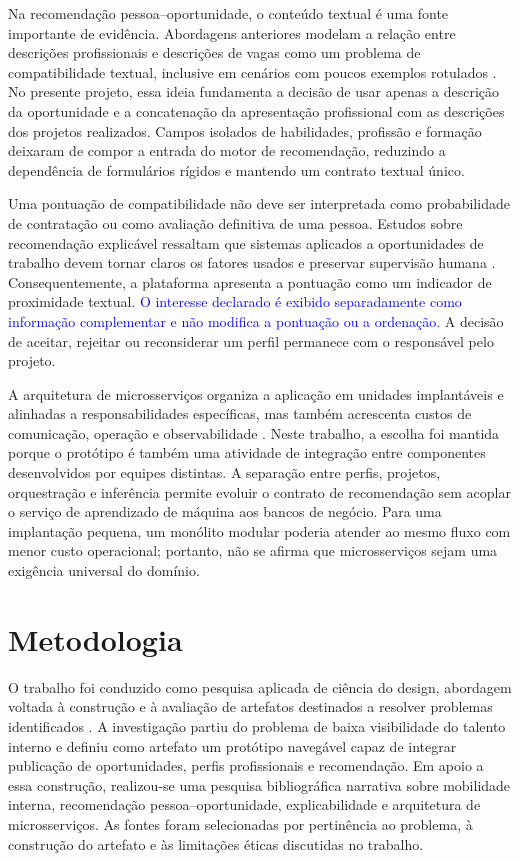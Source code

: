 \documentclass[12pt]{article}
\begin{document}
Na recomendação pessoa--oportunidade, o conteúdo textual é uma fonte importante de evidência. Abordagens anteriores modelam a relação entre descrições profissionais e descrições de vagas como um problema de compatibilidade textual, inclusive em cenários com poucos exemplos rotulados \cite{bian2019domain}. No presente projeto, essa ideia fundamenta a decisão de usar apenas a descrição da oportunidade e a concatenação da apresentação profissional com as descrições dos projetos realizados. Campos isolados de habilidades, profissão e formação deixaram de compor a entrada do motor de recomendação, reduzindo a dependência de formulários rígidos e mantendo um contrato textual único.

Uma pontuação de compatibilidade não deve ser interpretada como probabilidade de contratação ou como avaliação definitiva de uma pessoa. Estudos sobre recomendação explicável ressaltam que sistemas aplicados a oportunidades de trabalho devem tornar claros os fatores usados e preservar supervisão humana \cite{tang2025explainable}. Consequentemente, a plataforma apresenta a pontuação como um indicador de proximidade textual. \textcolor{blue}{O interesse declarado é exibido separadamente como informação complementar e não modifica a pontuação ou a ordenação.} A decisão de aceitar, rejeitar ou reconsiderar um perfil permanece com o responsável pelo projeto.

A arquitetura de microsserviços organiza a aplicação em unidades implantáveis e alinhadas a responsabilidades específicas, mas também acrescenta custos de comunicação, operação e observabilidade \cite{pahl2016microservices}. Neste trabalho, a escolha foi mantida porque o protótipo é também uma atividade de integração entre componentes desenvolvidos por equipes distintas. A separação entre perfis, projetos, orquestração e inferência permite evoluir o contrato de recomendação sem acoplar o serviço de aprendizado de máquina aos bancos de negócio. Para uma implantação pequena, um monólito modular poderia atender ao mesmo fluxo com menor custo operacional; portanto, não se afirma que microsserviços sejam uma exigência universal do domínio.

\section{Metodologia}

O trabalho foi conduzido como pesquisa aplicada de ciência do design, abordagem voltada à construção e à avaliação de artefatos destinados a resolver problemas identificados \cite{peffers2007design}. A investigação partiu do problema de baixa visibilidade do talento interno e definiu como artefato um protótipo navegável capaz de integrar publicação de oportunidades, perfis profissionais e recomendação. Em apoio a essa construção, realizou-se uma pesquisa bibliográfica narrativa sobre mobilidade interna, recomendação pessoa--oportunidade, explicabilidade e arquitetura de microsserviços. As fontes foram selecionadas por pertinência ao problema, à construção do artefato e às limitações éticas discutidas no trabalho.
\end{document}
